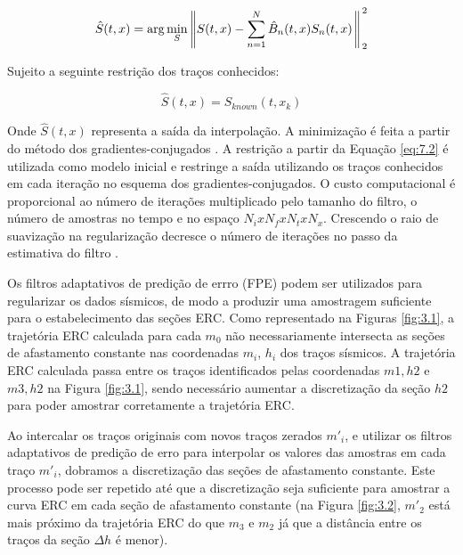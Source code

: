 \begin{equation}
\label{eq:7.1}
 \hat{S}(t,x) = \arg \min_S \left \rVert S(t,x) - \sum^N_{n=1}\hat{B}_n(t,x) S_n(t,x) \right \Arrowvert^2_2
\end{equation}

Sujeito a seguinte restrição dos traços conhecidos:

\begin{equation}
\label{eq:7.2}
 \hat{S}(t,x) = S_{known}(t,x_k)
\end{equation}

Onde $\hat{S}(t,x)$ representa a saída da interpolação.
A minimização é feita a partir do método dos gradientes-conjugados \cite{hestenes}. 
A restrição a partir da Equação \ref{eq:7.2} é utilizada como modelo inicial e restringe
a saída utilizando os traços conhecidos em cada iteração no esquema dos gradientes-conjugados.
O custo computacional é proporcional ao número de iterações multiplicado
pelo tamanho do filtro, o número de amostras no tempo e no espaço $N_i x N_f x N_t x N_x$. 
Crescendo o raio de suavização na regularização decresce o número de iterações no passo da
estimativa do filtro \cite{liu11}.

Os filtros adaptativos de predição de errro (FPE) podem ser utilizados para regularizar os dados sísmicos,
de modo a produzir uma amostragem suficiente para o estabelecimento das seções ERC.
Como representado na Figuras \ref{fig:3.1}, a trajetória ERC calculada para cada $m_0$ não
necessariamente intersecta as seções de afastamento constante nas coordenadas $m_i$, $h_i$ dos traços sísmicos. 
A trajetória ERC calculada passa entre os traços identificados pelas coordenadas $m1,h2$ e $m3, h2$ na Figura \ref{fig:3.1},
sendo necessário aumentar a discretização da seção $h2$ para poder amostrar corretamente a trajetória ERC.

Ao intercalar os traços originais com novos traços zerados $m'_i$, e utilizar os filtros adaptativos de predição
de erro para interpolar os valores das amostras em cada traço $m'_i$, dobramos 
a discretização das seções de afastamento constante.
Este processo pode ser repetido até que a discretização seja suficiente para amostrar a curva ERC em cada seção de afastamento
constante (na Figura \ref{fig:3.2}, $m'_2$ está mais próximo da trajetória 
ERC do que $m_3$ e $m_2$ já que a distância 
entre os traços da seção $\Delta h$ é menor).

